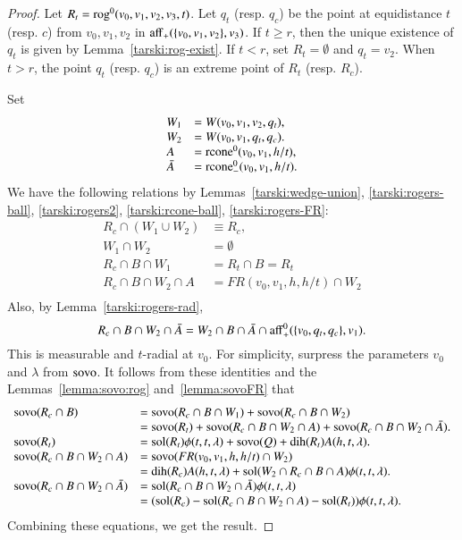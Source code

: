 \begin{proof}  Let $R_t= {\operatorname{rog}}^0(v_0,v_1,v_2,v_3,t)$.   Let
$q_t$ (resp. $q_c$) be the point at equidistance $t$ 
(resp. $c$) from $v_0,v_1,v_2$ in
${\operatorname{aff}}_+(\{v_0,v_1,v_2\},v_3)$.
If $t\ge r$, then the unique existence of $q_t$ is given by
Lemma~\ref{tarski:rog-exist}.  If $t< r$, set $R_t=\emptyset$ and
$q_t=v_2$.
When $t>r$, the point $q_t$ (resp. $q_c$) is an extreme point of $R_t$ (resp. $R_c$).

Set
  $$
  \begin{array}{lll}
  W_1 &= W(v_0,v_1,v_2,q_t),\\  
  W_2 &= W(v_0,v_1,q_t,q_c).\\
  A &= {\operatorname{rcone}}^0(v_0,v_1,h/t),\\
  \bar A &= {\operatorname{rcone}}^0_-(v_0,v_1,h/t).\\
  \end{array}
  $$
We have the following relations by Lemmas~\ref{tarski:wedge-union},
\ref{tarski:rogers-ball}, \ref{tarski:rogers2}, \ref{tarski:rcone-ball}, \ref{tarski:rogers-FR}:
  $$
  \begin{array}{rll}
  R_c \cap (W_1\cup W_2) &\equiv R_c,\\
  W_1\cap W_2 &= \emptyset\\
  R_c \cap B \cap W_1 &= R_t \cap B = R_t\\
  R_c\cap B \cap W_2 \cap A &= FR(v_0,v_1,h,h/t)\cap W_2\\
  \end{array}
  $$
Also, by Lemma~\ref{tarski:rogers-rad},
  $$R_c\cap B\cap W_2\cap \bar A = W_2\cap B\cap \bar A \cap
   {\operatorname{aff}}_+^0(\{v_0,q_t,q_c\},v_1).$$ 
This is measurable and $t$-radial
at $v_0$.
For simplicity, surpress the parameters $v_0$ and $\lambda$ from
${\operatorname{sovo}}$.  It follows from these identities and the
Lemmas~\ref{lemma:sovo:rog} 
and~\ref{lemma:sovoFR} that
  $$
  \begin{array}{lll}
  {\operatorname{sovo}}(R_c\cap B) &= {\operatorname{sovo}}(R_c\cap B\cap W_1) + 
  {\operatorname{sovo}}(R_c\cap B\cap W_2)\\
  &= {\operatorname{sovo}}(R_t)+ {\operatorname{sovo}}(R_c\cap B\cap W_2\cap A) +
  {\operatorname{sovo}}(R_c\cap B\cap W_2\cap \bar A).\\
  {\operatorname{sovo}}(R_t) &=\operatorname{sol}(R_t)\phi(t,t,\lambda) + {\operatorname{sovo}}(Q) +
     \operatorname{dih}(R_t) A(h,t,\lambda).\\
  {\operatorname{sovo}}(R_c\cap B\cap W_2\cap A) &= {\operatorname{sovo}}(FR(v_0,v_1,h,h/t)\cap W_2)\\
   &= \operatorname{dih}(R_c) A(h,t,\lambda) + \operatorname{sol}(W_2\cap R_c\cap B\cap A)\phi(t,t,\lambda).\\
   {\operatorname{sovo}}(R_c\cap B\cap W_2\cap \bar A) &= 
        \operatorname{sol}(R_c\cap B\cap W_2\cap \bar A) \phi(t,t,\lambda)\\
   &= (\operatorname{sol}(R_c)-\operatorname{sol}(R_c\cap B\cap W_2\cap A) -\operatorname{sol}(R_t))\phi(t,t,\lambda).
  \end{array}
  $$
Combining these equations, we get the result.
\end{proof}

